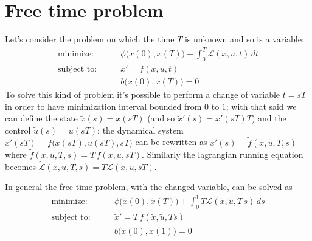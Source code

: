 \section{Free time problem}
	Let's consider the problem on which the time $T$ is unknown and so is a variable:
	\begin{align*}
		\textrm{minimize:} \qquad & \phi\big(x(0),x(T)\big) + \int_0^T \mathcal L(x,u,t) \, dt \\
		\textrm{subject to:} \qquad & x' = f(x,u,t) \\ & b\big(x(0), x(T)\big) = 0
	\end{align*}
	To solve this kind of problem it's possible to perform a change of variable $t = sT$ in order to have minimization interval bounded from $0$ to $1$; with that said we can define the state $\tilde x(s) = x(sT)$ (and so $\tilde x'(s) = x'(sT)T$) and the control $\tilde u(s) = u(sT)$; the dynamical system  $x'(sT) = f \big( x(sT), u(sT),sT \big)$ can be rewritten as $\tilde x'(s) = \tilde f(\tilde x,\tilde u,T,s)$ where $\tilde f(x,u,T,s) = T \, f(x,u,sT)$. Similarly the lagrangian running equation becomes $\tilde{\mathcal L}(x,u,T,s) = T \mathcal L(x,u, sT)$.
	
	In general the free time problem, with the changed variable, can be solved as
	\begin{align*}
		\textrm{minimize:} \qquad & \phi\big(\tilde x(0),\tilde x(T)\big) + \int_0^1 T \mathcal L(\tilde x,\tilde u,T\,s) \, ds \\
		\textrm{subject to:} \qquad & \tilde x' = T\, f(\tilde x,\tilde u,Ts) \\ & b\big(\tilde x(0), \tilde x(1)\big) = 0
	\end{align*}
	
	
	
	
	
	
	
	
	